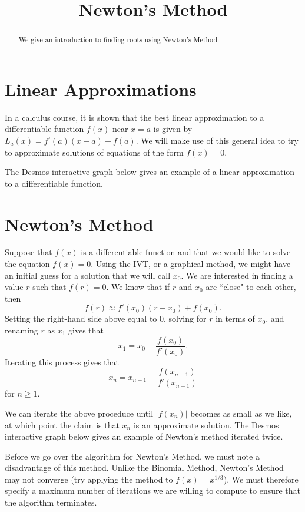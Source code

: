 \documentclass{ximera}
\title{Newton's Method}
\begin{document}
  
\begin{abstract}  
We give an introduction to finding roots using Newton's Method.
\end{abstract}  
\maketitle

\section{Linear Approximations}

In a calculus course, it is shown that the best linear approximation to a differentiable function $f(x)$ near $x=a$ is given by $L_a(x)=f'(a)(x-a)+f(a)$. We will make use of this general idea to try to approximate solutions of equations of the form $f(x)=0$. 

The Desmos interactive graph below gives an example of a linear approximation to a differentiable function.


\section{Newton's Method}

Suppose that $f(x)$ is a differentiable function and that we would like to solve the equation $f(x)=0$. Using the IVT, or a graphical method, we might have an initial guess for a solution that we will call $x_0$. We are interested in finding a value $r$ such that $f(r)=0$. We know that if $r$ and $x_0$ are ``close" to each other, then $$f(r)\approx f'(x_0)(r-x_0)+f(x_0).$$ Setting the right-hand side above equal to 0, solving for $r$ in terms of $x_0$, and renaming $r$ as $x_1$ gives that $$x_1=x_0-\frac{f(x_0)}{f'(x_0)}.$$ Iterating this process gives that $$x_n=x_{n-1}-\frac{f(x_{n-1})}{f'(x_{n-1})}$$ for $n\geq 1$.  

We can iterate the above proceduce until $|f(x_n)|$ becomes as small as we like, at which point the claim is that $x_n$ is an approximate solution. The Desmos interactive graph below gives an example of Newton's method iterated twice.


Before we go over the algorithm for Newton's Method, we must note a disadvantage of this method. Unlike the Binomial Method, Newton's Method may not converge (try applying the method to $f(x)=x^{1/3}$). We must therefore specify a maximum number of iterations we are willing to compute to ensure that the algorithm terminates.
\end{document}
